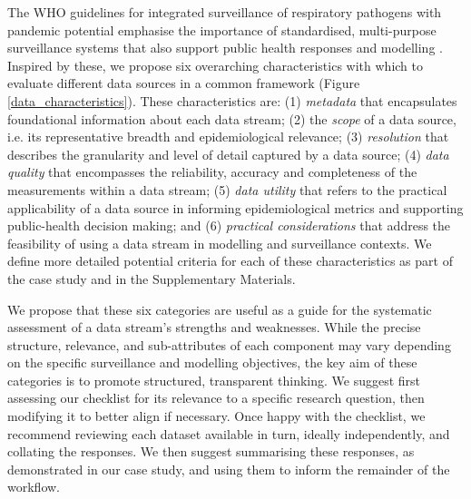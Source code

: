 \documentclass{article}
\begin{document}
The WHO guidelines for integrated surveillance of respiratory pathogens with pandemic potential emphasise the importance of standardised, multi-purpose surveillance systems that also support public health responses and modelling \citep{world2024implementing}. Inspired by these, we propose six overarching characteristics with which to evaluate different data sources in a common framework (Figure \ref{data_characteristics}).  These characteristics are: (1) \textit{metadata}  that encapsulates foundational information about each data stream; (2) the \textit{scope} of a data source, i.e. its representative breadth and epidemiological relevance; (3) \textit{resolution} that describes the granularity and level of detail captured by a data source; (4) \textit{data quality} that encompasses the reliability, accuracy and completeness of the measurements within a data stream; (5) \textit{data utility} that refers to the practical applicability of a data source in informing epidemiological metrics and supporting public-health decision making; and (6)\textit{ practical considerations} that address the feasibility of using a data stream in modelling and surveillance contexts. We define more detailed potential criteria for each of these characteristics as part of the case study and in the Supplementary Materials. 

We propose that these six categories are useful as a guide for the systematic assessment of a data stream's strengths and weaknesses. While the precise structure, relevance, and sub-attributes of each component may vary depending on the specific surveillance and modelling objectives, the key aim of these categories is to promote structured, transparent thinking. We suggest first assessing our checklist for its relevance to a specific research question, then modifying it to better align if necessary. Once happy with the checklist, we recommend reviewing each dataset available in turn, ideally independently, and collating the responses. We then suggest summarising these responses, as demonstrated in our case study, and using them to inform the remainder of the workflow.
\end{document}
